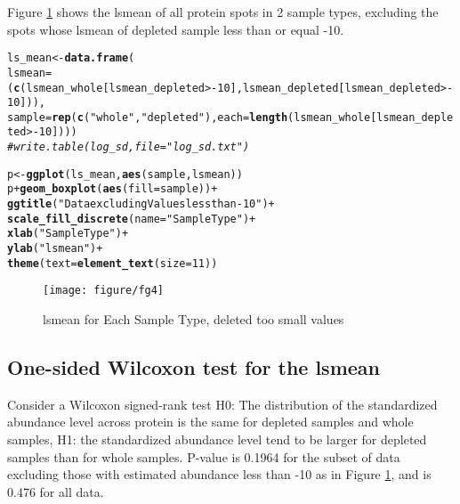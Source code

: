 \documentclass{article}\usepackage[]{graphicx}\usepackage[]{color}
\makeatletter
\def\maxwidth{ %
  \ifdim\Gin@nat@width>\linewidth
    \linewidth
  \else
    \Gin@nat@width
  \fi
}
\newcommand{\hlnum}[1]{\textcolor[rgb]{0.686,0.059,0.569}{#1}}%
\newcommand{\hlstr}[1]{\textcolor[rgb]{0.192,0.494,0.8}{#1}}%
\newcommand{\hlcom}[1]{\textcolor[rgb]{0.678,0.584,0.686}{\textit{#1}}}%
\newcommand{\hlopt}[1]{\textcolor[rgb]{0,0,0}{#1}}%
\newcommand{\hlstd}[1]{\textcolor[rgb]{0.345,0.345,0.345}{#1}}%
\newcommand{\hlkwb}[1]{\textcolor[rgb]{0.69,0.353,0.396}{#1}}%
\newcommand{\hlkwc}[1]{\textcolor[rgb]{0.333,0.667,0.333}{#1}}%
\newcommand{\hlkwd}[1]{\textcolor[rgb]{0.737,0.353,0.396}{\textbf{#1}}}%
\newenvironment{kframe}{%
 \def\at@end@of@kframe{}%
 \ifinner\ifhmode%
  \def\at@end@of@kframe{\end{minipage}}%
  \begin{minipage}{\columnwidth}%
 \fi\fi%
 \def\FrameCommand##1{\hskip\@totalleftmargin \hskip-\fboxsep
 \colorbox{shadecolor}{##1}\hskip-\fboxsep
     \hskip-\linewidth \hskip-\@totalleftmargin \hskip\columnwidth}%
 \MakeFramed {\advance\hsize-\width
   \@totalleftmargin\z@ \linewidth\hsize
   \@setminipage}}%
 {\par\unskip\endMakeFramed%
 \at@end@of@kframe}
\newenvironment{knitrout}{}{} %
\makeatother
\begin{document}
Figure \ref{fig:fg4} shows the  lsmean of all protein spots in 2 sample types, excluding the spots whose lsmean of depleted sample less than or equal -10.
\begin{knitrout}
\color{fgcolor}\begin{kframe}
\begin{alltt}
\hlstd{ls_mean} \hlkwb{<-} \hlkwd{data.frame}\hlstd{(}
  \hlkwc{lsmean} \hlstd{= (}\hlkwd{c}\hlstd{(lsmean_whole[lsmean_depleted} \hlopt{>-}\hlnum{10}\hlstd{], lsmean_depleted[lsmean_depleted} \hlopt{>-}\hlnum{10}\hlstd{])),}
  \hlkwc{sample} \hlstd{=} \hlkwd{rep}\hlstd{(}\hlkwd{c}\hlstd{(}\hlstr{"whole"}\hlstd{,} \hlstr{"depleted"}\hlstd{),} \hlkwc{each} \hlstd{=} \hlkwd{length}\hlstd{(lsmean_whole[lsmean_depleted} \hlopt{>-}\hlnum{10}\hlstd{])))}
\hlcom{# write.table(log_sd, file = "log_sd.txt")}

\hlstd{p} \hlkwb{<-} \hlkwd{ggplot}\hlstd{(ls_mean,} \hlkwd{aes}\hlstd{(sample, lsmean))}
\hlstd{p} \hlopt{+} \hlkwd{geom_boxplot}\hlstd{(}\hlkwd{aes}\hlstd{(}\hlkwc{fill} \hlstd{= sample))} \hlopt{+}
  \hlkwd{ggtitle}\hlstd{(}\hlstr{"Data excluding Values less than -10"}\hlstd{)} \hlopt{+}
  \hlkwd{scale_fill_discrete}\hlstd{(}\hlkwc{name}\hlstd{=} \hlstr{"Sample Type"}\hlstd{)} \hlopt{+}
  \hlkwd{xlab}\hlstd{(}\hlstr{"Sample Type"}\hlstd{)} \hlopt{+}
  \hlkwd{ylab}\hlstd{(}\hlstr{"lsmean"}\hlstd{)} \hlopt{+}
  \hlkwd{theme}\hlstd{(}\hlkwc{text} \hlstd{=} \hlkwd{element_text}\hlstd{(}\hlkwc{size}\hlstd{=}\hlnum{11}\hlstd{))}
\end{alltt}
\end{kframe}\begin{figure}[H]

\texttt{[image: figure/fg4]} \caption[lsmean for Each Sample Type, deleted too small values]{lsmean for Each Sample Type, deleted too small values\label{fig:fg4}}
\end{figure}


\end{knitrout}



\subsection{One-sided Wilcoxon test for the lsmean}
Consider a Wilcoxon signed-rank test H0: The distribution of the  standardized abundance level across protein   is the same for  depleted samples and whole samples, H1: the standardized abundance level tend to be larger for depleted samples than for whole samples. P-value is 0.1964 for the subset of data excluding those with estimated abundance less than -10 as in Figure \ref{fig:fg4}, and is 0.476 for all data.
\end{document}
